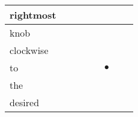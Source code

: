 \documentclass[landscape]{article}
\newcommand{\ssp}{\hspace{2pt}}
\newcommand{\mex}{\cellcolor{g}$\bullet$}
\begin{document}
\begin{tabular}{|l|p{10pt}|p{10pt}|p{10pt}|p{10pt}|p{10pt}|p{10pt}|p{10pt}|}
\hline
\ssp rightmost \ssp&\hspace{2pt}&\hspace{2pt}&\hspace{2pt}&\hspace{2pt}&\hspace{2pt}&\hspace{2pt}&\hspace{2pt}\\
\hline
\ssp knob \ssp&\hspace{2pt}&\hspace{2pt}&\hspace{2pt}&\hspace{2pt}&\hspace{2pt}&\hspace{2pt}&\hspace{2pt}\\
\hline
\ssp clockwise \ssp&\hspace{2pt}&\hspace{2pt}&\hspace{2pt}&\hspace{2pt}&\hspace{2pt}&\hspace{2pt}&\hspace{2pt}\\
\hline
\ssp \cellcolor{ref4}to \ssp&\hspace{2pt}&\hspace{2pt}&\hspace{2pt}&\hspace{2pt}&\hspace{2pt}\mex&\hspace{2pt}&\hspace{2pt}\\
\hline
\ssp the \ssp&\hspace{2pt}&\hspace{2pt}&\hspace{2pt}&\hspace{2pt}&\hspace{2pt}&\hspace{2pt}&\hspace{2pt}\\
\hline
\ssp desired \ssp&\hspace{2pt}&\hspace{2pt}&\hspace{2pt}&\hspace{2pt}&\hspace{2pt}&\hspace{2pt}&\hspace{2pt}\\

\end{tabular}
\end{document}
